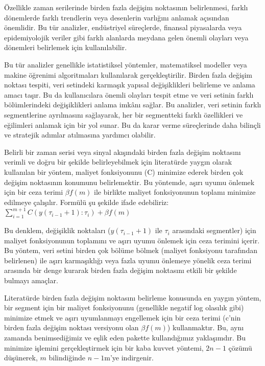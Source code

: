 \documentclass[12pt,twoside]{deuthesis}
\begin{document}
Özellikle zaman serilerinde birden fazla değişim noktasının belirlenmesi, farklı dönemlerde farklı trendlerin veya desenlerin varlığını anlamak açısından önemlidir. Bu tür analizler, endüstriyel süreçlerde, finansal piyasalarda veya epidemiyolojik veriler gibi farklı alanlarda meydana gelen önemli olayları veya dönemleri belirlemek için kullanılabilir.

Bu tür analizler genellikle istatistiksel yöntemler, matematiksel modeller veya makine öğrenimi algoritmaları kullanılarak gerçekleştirilir. Birden fazla değişim noktası tespiti, veri setindeki karmaşık yapısal değişiklikleri belirleme ve anlama amacı taşır. Bu da kullanıcılara önemli olayları tespit etme ve veri setinin farklı bölümlerindeki değişiklikleri anlama imkânı sağlar. Bu analizler, veri setinin farklı segmentlerine ayrılmasını sağlayarak, her bir segmentteki farklı özellikleri ve eğilimleri anlamak için bir yol sunar. Bu da karar verme süreçlerinde daha bilinçli ve stratejik adımlar atılmasına yardımcı olabilir.

Belirli bir zaman serisi veya sinyal akışındaki birden fazla değişim noktasını verimli ve doğru bir şekilde belirleyebilmek için literatürde yaygın olarak kullanılan bir yöntem, maliyet fonksiyonunu (C) minimize ederek birden çok değişim noktasının konumunu belirlemektir. Bu yöntemde, aşırı uyumu önlemek için bir ceza terimi \(\beta f(m)\) ile birlikte maliyet fonksiyonunun toplamı minimize edilmeye çalışılır. Formülü şu şekilde ifade edebiliriz: \(\sum_{i=1}^{m+1} C(y(\tau_{i-1}+1):\tau_i) + \beta f(m)\)

Bu denklem, değişiklik noktaları (\(y(\tau_{i-1}+1)\) ile \(\tau_i\) arasındaki segmentler) için maliyet fonksiyonunun toplamını ve aşırı uyumu önlemek için ceza terimini içerir. Bu yöntem, veri setini birden çok bölüme bölmek (maliyet fonksiyonu tarafından belirlenen) ile aşırı karmaşıklığı veya fazla uyumu önlemeye yönelik ceza terimi arasında bir denge kurarak birden fazla değişim noktasını etkili bir şekilde bulmayı amaçlar.

Literatürde birden fazla değişim noktasını belirleme konusunda en yaygın yöntem, bir segment için bir maliyet fonksiyonunu (genellikle negatif log olasılık gibi) minimize etmek ve aşırı uyumlanmayı engellemek için bir ceza terimi (c'nin birden fazla değişim noktası versiyonu olan \(\beta f(m)\)) kullanmaktır. Bu, aynı zamanda benimsediğimiz ve eşlik eden pakette kullandığımız yaklaşımdır. Bu minimize işlemini gerçekleştirmek için bir kaba kuvvet yöntemi, \(2n-1\) çözümü düşünerek, \(m\) bilindiğinde \(n-1\)m'ye indirgenir.
\end{document}
